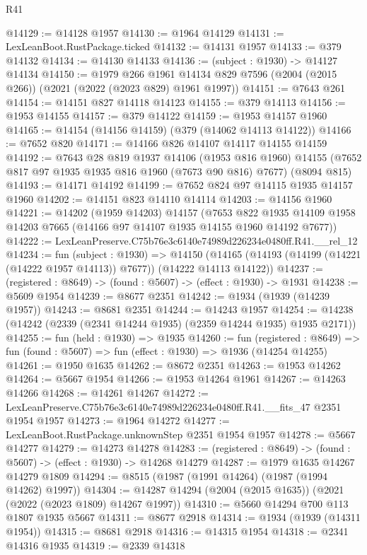 \begin{lexlean}{R41}
\begin{coremodule}
@14129 := @14128 @1957
@14130 := @1964 @14129
@14131 := LexLeanBoot.RustPackage.ticked
@14132 := @14131 @1957
@14133 := @379 @14132
@14134 := @14130 @14133
@14136 := (subject : @1930) -> @14127 @14134
@14150 := @1979
    @266
    @1961
    @14134
    @829
    @7596
    (@2004 (@2015 @266))
    (@2021 (@2022 (@2023 @829) @1961 @1997))
@14151 := @7643 @261
@14154 := @14151 @827 @14118 @14123
@14155 := @379 @14113
@14156 := @1953 @14155
@14157 := @379 @14122
@14159 := @1953 @14157 @1960
@14165 := @14154 (@14156 @14159) (@379 (@14062 @14113 @14122))
@14166 := @7652 @820
@14171 := @14166 @826 @14107 @14117 @14155 @14159
@14192 := @7643
    @28
    @819
    @1937
    @14106
    (@1953 @816 @1960)
    @14155
    (@7652 @817 @97 @1935 @1935 @816 @1960 (@7673 @90 @816) @7677)
    (@8094 @815)
@14193 := @14171 @14192
@14199 := @7652 @824 @97 @14115 @1935 @14157 @1960
@14202 := @14151 @823 @14110 @14114
@14203 := @14156 @1960
@14221 := @14202
    (@1959 @14203)
    @14157
    (@7653 @822 @1935 @14109 @1958 @14203 @7665 (@14166 @97 @14107 @1935 @14155 @1960 @14192 @7677))
@14222 := LexLeanPreserve.C75b76e3c6140e74989d226234e0480ff.R41.__rel_12
@14234 := fun (subject : @1930) =>
  @14150 (@14165 (@14193 (@14199 (@14221 (@14222 @1957 @14113)) @7677)) (@14222 @14113 @14122))
@14237 := (registered : @8649) -> (found : @5607) -> (effect : @1930) -> @1931
@14238 := @5609 @1954
@14239 := @8677 @2351
@14242 := @1934 (@1939 (@14239 @1957))
@14243 := @8681 @2351
@14244 := @14243 @1957
@14254 := @14238 (@14242 (@2339 (@2341 @14244 @1935) (@2359 @14244 @1935) @1935 @2171))
@14255 := fun (held : @1930) => @1935
@14260 := fun (registered : @8649) =>
  fun (found : @5607) => fun (effect : @1930) => @1936 (@14254 @14255)
@14261 := @1950 @1635
@14262 := @8672 @2351
@14263 := @1953 @14262
@14264 := @5667 @1954
@14266 := @1953 @14264 @1961
@14267 := @14263 @14266
@14268 := @14261 @14267
@14272 := LexLeanPreserve.C75b76e3c6140e74989d226234e0480ff.R41.__fits_47 @2351 @1954 @1957
@14273 := @1964 @14272
@14277 := LexLeanBoot.RustPackage.unknownStep @2351 @1954 @1957
@14278 := @5667 @14277
@14279 := @14273 @14278
@14283 := (registered : @8649) -> (found : @5607) -> (effect : @1930) -> @14268 @14279
@14287 := @1979 @1635 @14267 @14279 @1809
@14294 := @8515 (@1987 (@1991 @14264) (@1987 (@1994 @14262) @1997))
@14304 := @14287 @14294 (@2004 (@2015 @1635)) (@2021 (@2022 (@2023 @1809) @14267 @1997))
@14310 := @5660 @14294 @700 @113 @1807 @1935 @5667
@14311 := @8677 @2918
@14314 := @1934 (@1939 (@14311 @1954))
@14315 := @8681 @2918
@14316 := @14315 @1954
@14318 := @2341 @14316 @1935
@14319 := @2339 @14318

\end{coremodule}
\end{lexlean}
